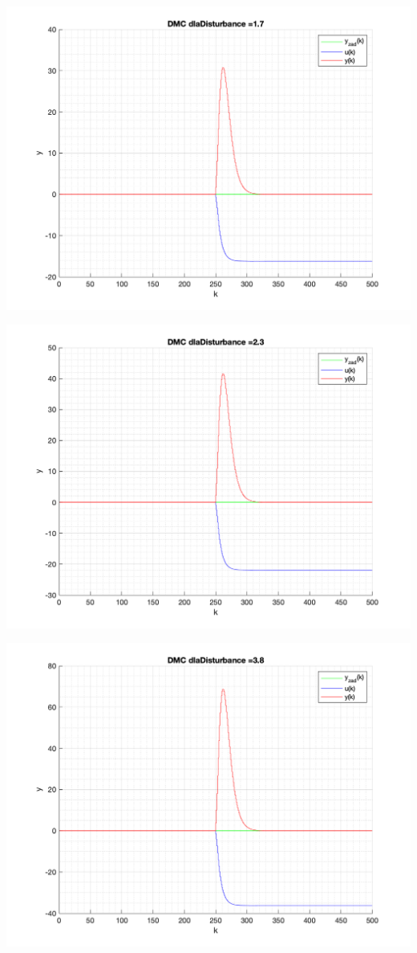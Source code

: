 \documentclass[a4paper, 11pt]{article}
\begin{document}
\begin{enumerate}
 \includegraphics[width=\linewidth]{./ModelsP4_Disturbance/P4_DMC_Disturbance_1_7_png.png} 
 
 \includegraphics[width=\linewidth]{./ModelsP4_Disturbance/P4_DMC_Disturbance_2_3_png.png} 
 
 \includegraphics[width=\linewidth]{./ModelsP4_Disturbance/P4_DMC_Disturbance_3_8_png.png} 
 

\end{enumerate}
\end{document}
